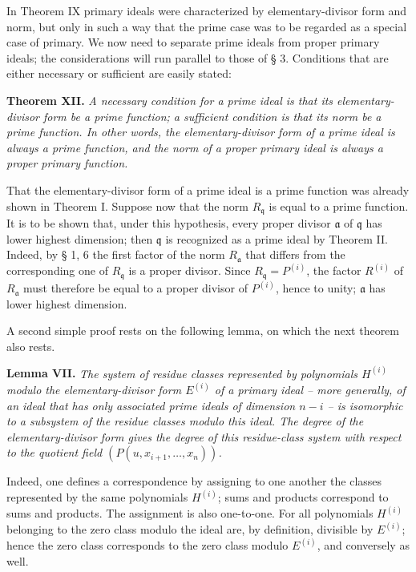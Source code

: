 \documentclass[11pt]{article}
\providecommand{\frakq}{\mathfrak q}
\providecommand{\fraka}{\mathfrak a}
\begin{document}
In Theorem IX primary ideals were characterized by elementary-divisor form and norm, but only in such a way that the prime case was to be regarded as a special case of primary. We now need to separate prime ideals from proper primary ideals; the considerations will run parallel to those of § 3. Conditions that are either necessary or sufficient are easily stated:

\textbf{Theorem XII.} \emph{A necessary condition for a prime ideal is that its elementary-divisor form be a prime function; a sufficient condition is that its norm be a prime function. In other words, the elementary-divisor form of a prime ideal is always a prime function, and the norm of a proper primary ideal is always a proper primary function.}

That the elementary-divisor form of a prime ideal is a prime function was already shown in Theorem I. Suppose now that the norm $R_{\frakq}$ is equal to a prime function. It is to be shown that, under this hypothesis, every proper divisor $\fraka$ of $\frakq$ has lower highest dimension; then $\frakq$ is recognized as a prime ideal by Theorem II. Indeed, by § 1, 6 the first factor of the norm $R_\fraka$ that differs from the corresponding one of $R_\frakq$ is a proper divisor. Since $R_\frakq=P^{(i)}$, the factor $R^{(i)}$ of $R_\fraka$ must therefore be equal to a proper divisor of $P^{(i)}$, hence to unity; $\fraka$ has lower highest dimension.

A second simple proof rests on the following lemma, on which the next theorem also rests.

\textbf{Lemma VII.} \emph{The system of residue classes represented by polynomials $H^{(i)}$ modulo the elementary-divisor form $E^{(i)}$ of a primary ideal -- more generally, of an ideal that has only associated prime ideals of dimension $n-i$ -- is isomorphic to a subsystem of the residue classes modulo this ideal. The degree of the elementary-divisor form gives the degree of this residue-class system with respect to the quotient field $(P(u,x_{i+1},\ldots,x_n))$.}

Indeed, one defines a correspondence by assigning to one another the classes represented by the same polynomials $H^{(i)}$; sums and products correspond to sums and products. The assignment is also one-to-one. For all polynomials $H^{(i)}$ belonging to the zero class modulo the ideal are, by definition, divisible by $E^{(i)}$; hence the zero class corresponds to the zero class modulo $E^{(i)}$, and conversely as well.
\end{document}
